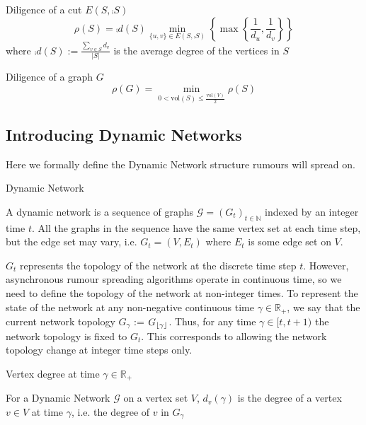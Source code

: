 \begin{definition}
	Diligence of a cut $ E(S, \comp{S}) $
	$$
		\rho(S) = \comp{d}(S) \min_{\{u, v\} \in E(S, \comp{S}) } \left\{ \max \left\{ \frac{1}{d_u},\frac{1}{d_v} \right\} \right\}
	$$ 
	where $\comp{d}(S) := \frac{\sum_{v \in S} d_v}{|S|}$ is the average degree of the vertices in $S$
\end{definition}

\begin{definition} %
	Diligence of a graph $G$
	$$
		\rho(G) = \min_{0 < \text{vol}(S) \leq \frac{\text{vol}(V)}{2}} \rho(S) 
	$$
\end{definition}

\subsection{Introducing Dynamic Networks}

Here we formally define the Dynamic Network structure rumours will spread on.

\begin{definition}
	Dynamic Network

	\noindent
	A dynamic network is a sequence of graphs $\mathcal{G} = (G_t)_{t \in \mathbb{N}}$ indexed by an integer time $t$. All the graphs in the sequence have the same vertex set at each time step, but the edge set may vary, i.e.  $G_t = (V, E_t)$ where $E_t$ is some edge set on $V$.
\end{definition}

$G_t$ represents the topology of the network at the discrete time step $t$. However, asynchronous rumour spreading algorithms operate in continuous time, so we need to define the topology of the network at non-integer times. To represent the state of the network at any non-negative continuous time $\gamma \in \mathbb{R}_+$, we say that the current network topology $G_\gamma$ := $G_{\lfloor\gamma\rfloor}$. Thus, for any time $\gamma \in [t, t + 1)$ the network topology is fixed to $G_t$. This corresponds to allowing the network topology change at integer time steps only.


\begin{definition}
	Vertex degree at time $\gamma \in \mathbb{R}_+ $ 

	\noindent
	For a Dynamic Network $\mathcal{G}$ on a vertex set $V$, $d_v(\gamma)$ is the degree of a vertex $v \in V$ at time $\gamma$, i.e. the degree of $v$ in $G_\gamma$
\end{definition}


